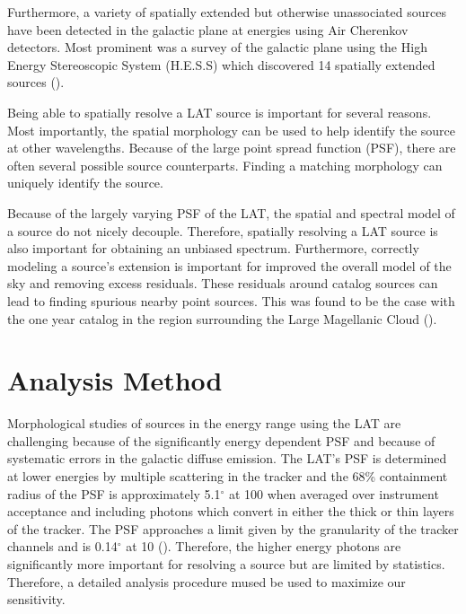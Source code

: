 \documentclass[12pt,preprint]{aastex}
\newcommand{\mev}{\text{MeV}\xspace}
\newcommand{\gev}{\text{GeV}\xspace}
\newcommand{\tev}{\text{TeV}\xspace}
\renewcommand{\deg}{\ensuremath{^\circ}\xspace}
\begin{document}
Furthermore, a variety of spatially extended but otherwise unassociated
sources have been detected in the galactic plane at \tev energies using
Air Cherenkov detectors. Most prominent was a survey of the galactic plane
using the High Energy Stereoscopic System (H.E.S.S) which discovered 14
spatially extended sources (\cite{HESS_plane_survey}).

Being able to spatially resolve a LAT source is important for several
reasons. Most importantly, the spatial morphology can be used to
help identify the source at other wavelengths. Because of the large
point spread function (PSF), there are often several possible source
counterparts.  Finding a matching morphology can uniquely identify
the source.

Because of the largely varying PSF of the LAT, the spatial and spectral
model of a source do not nicely decouple. Therefore, spatially resolving
a LAT source is also important for obtaining an unbiased spectrum.
Furthermore, correctly modeling a source's extension is important for
improved the overall model of the sky and removing excess residuals.
These residuals around catalog sources can lead to finding spurious nearby
point sources. This was found to be the case with the one year catalog
in the region surrounding the Large Magellanic Cloud (\cite{first_cat}).


\section{Analysis Method}


Morphological studies of sources in the \gev energy range
using the LAT are challenging because of the significantly energy
dependent PSF and because of systematic errors in the galactic diffuse
emission.  The LAT's PSF is determined at lower energies by multiple
scattering in the tracker and the 68\% containment radius of the PSF is
approximately 5.1\deg at 100 \mev  when averaged over instrument acceptance
and including photons which convert in either the thick or thin layers of
the tracker. The PSF approaches a limit given by the granularity of the
tracker channels and is 0.14\deg at 10 \gev (\cite{on_orbit_calibration}).
Therefore, the higher energy photons are significantly more important for
resolving a source but are limited by statistics. Therefore,
a detailed analysis procedure mused be used to maximize our
sensitivity.
\end{document}
